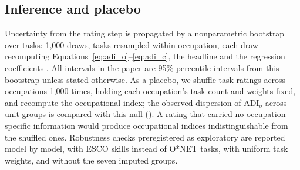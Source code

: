 \subsection{Inference and placebo}

Uncertainty from the rating step is propagated by a nonparametric bootstrap over tasks: 1,000 draws, tasks resampled within occupation, each draw recomputing Equations~\ref{eq:adi_o}--\ref{eq:adi_c}, the headline and the regression coefficients \citep{efron1993introduction}.
All intervals in the paper are 95\% percentile intervals from this bootstrap unless stated otherwise.
As a placebo, we shuffle task ratings across occupations 1,000 times, holding each occupation's task count and weights fixed, and recompute the occupational index; the observed dispersion of $\mathrm{ADI}_o$ across unit groups is compared with this null ().
A rating that carried no occupation-specific information would produce occupational indices indistinguishable from the shuffled ones.
Robustness checks preregistered as exploratory are reported model by model, with ESCO skills instead of O*NET tasks, with uniform task weights, and without the seven imputed groups.
